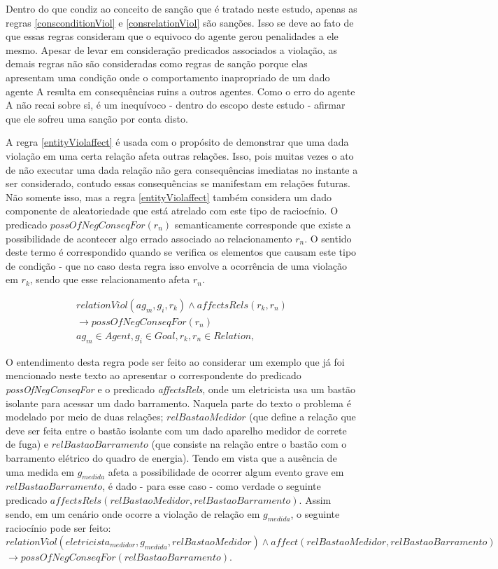 Dentro do que condiz ao conceito de sanção que é tratado neste estudo, apenas as regras \ref{consconditionViol} e \ref{consrelationViol} são sanções. Isso se deve ao fato de que essas regras consideram que o equivoco do agente gerou penalidades a ele mesmo. Apesar de levar em consideração predicados associados a violação, as demais regras não são consideradas como regras de sanção porque elas apresentam uma condição onde o comportamento inapropriado de um dado agente A resulta em consequências ruins a outros agentes. Como o erro do agente A não recai sobre si, é um inequívoco - dentro do escopo deste estudo - afirmar que ele sofreu uma sanção por conta disto. 


A regra \ref{entityViolaffect} é usada com o propósito de demonstrar que uma dada violação em uma certa relação afeta outras relações. Isso, pois muitas vezes o ato de não executar uma dada relação não gera consequências imediatas no instante a ser considerado, contudo essas consequências se manifestam em relações futuras. Não somente isso, mas a regra \ref{entityViolaffect} também considera um dado componente de aleatoriedade que está atrelado com este tipo de raciocínio. O predicado $possOfNegConseqFor(r_n)$ semanticamente corresponde que existe a possibilidade de acontecer algo errado associado ao relacionamento $r_n$. O sentido deste termo é correspondido quando se verifica os elementos que causam este tipo de condição - que no caso desta regra isso envolve a ocorrência de uma violação em $r_k$, sendo que esse relacionamento afeta $r_n$.


\begin{eqnarray}\label{entityViolaffect}
	relationViol(ag_m,g_i,r_k) \wedge affectsRels(r_k,r_n) \nonumber \\
    \to possOfNegConseqFor(r_n)  \nonumber \\
    ag_m \in Agent, g_i \in Goal, r_k,r_n \in Relation, 
\end{eqnarray}

O entendimento desta regra pode ser feito ao considerar um exemplo que já foi mencionado neste texto ao apresentar o correspondente do predicado \textit{possOfNegConseqFor} e o predicado \textit{affectsRels}, onde um eletricista usa um bastão isolante para acessar um dado barramento. Naquela parte do texto o problema é modelado por meio de duas relações; $relBastaoMedidor$ (que define a relação que deve ser feita entre o bastão isolante com um dado aparelho medidor de correte de fuga) e $relBastaoBarramento$ (que consiste na relação entre o bastão com o barramento elétrico do quadro de energia). Tendo em vista que a ausência de uma medida em $g_{medida}$ afeta a possibilidade de ocorrer algum evento grave em $relBastaoBarramento$, é dado - para esse caso - como verdade o seguinte predicado $affectsRels(relBastaoMedidor, relBastaoBarramento)$. Assim sendo, em um cenário onde ocorre a violação de relação em $g_{medida}$, o seguinte raciocínio pode ser feito: $relationViol(eletricista_{medidor},g_{medida},relBastaoMedidor) \wedge affect(relBastaoMedidor, relBastaoBarramento) $ \\ $\to  possOfNegConseqFor(relBastaoBarramento)$.   

